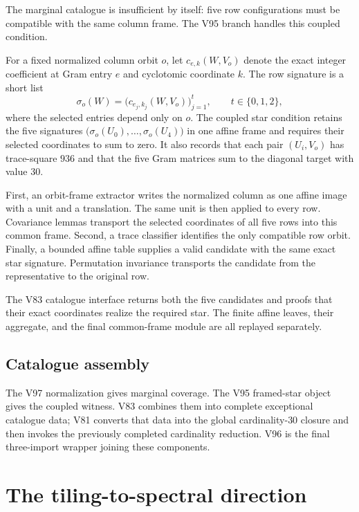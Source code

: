 \documentclass[10pt,twocolumn]{article}
\theoremstyle{definition}
\theoremstyle{remark}
\begin{document}
The marginal catalogue is insufficient by itself: five row configurations
must be compatible with the same column frame.  The V95 branch handles this
coupled condition.

For a fixed normalized column orbit $o$, let $c_{e,k}(W,V_o)$ denote the exact
integer coefficient at Gram entry $e$ and cyclotomic coordinate $k$.  The row
signature is a short list
\[
  \sigma_o(W)=\bigl(c_{e_j,k_j}(W,V_o)\bigr)_{j=1}^{t},
  \qquad t\in\{0,1,2\},
\]
where the selected entries depend only on $o$.  The coupled star condition
retains the five signatures
$\bigl(\sigma_o(U_0),\ldots,\sigma_o(U_4)\bigr)$ in one affine frame and
requires their selected coordinates to sum to zero.  It also records that each
pair $(U_i,V_o)$ has trace-square $936$ and that the five Gram matrices sum to
the diagonal target with value $30$.

First, an orbit-frame extractor writes the normalized column as one affine
image with a unit and a translation.  The same unit is then applied to every
row.  Covariance lemmas transport the selected coordinates of all five rows
into this common frame.  Second, a trace classifier identifies the only
compatible row orbit.
Finally, a bounded affine table supplies a valid candidate with the same exact
star signature.  Permutation invariance transports the candidate from the
representative to the original row.

The V83 catalogue interface returns both the five candidates and proofs that
their exact coordinates realize the required star.  The finite affine leaves,
their aggregate, and the final common-frame module are all replayed separately.

\subsection{Catalogue assembly}

The V97 normalization gives marginal coverage.  The V95 framed-star object
gives the coupled witness.  V83 combines them into complete exceptional
catalogue data; V81 converts that data into the global cardinality-$30$
closure and then invokes the previously completed cardinality reduction.  V96
is the final three-import wrapper joining these components.

\section{The tiling-to-spectral direction}
\end{document}
